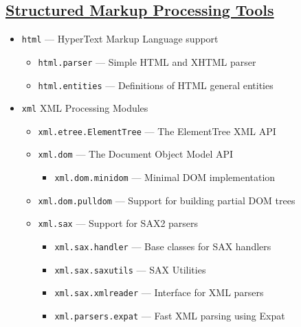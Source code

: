 \documentclass[]{book}
\providecommand{\tightlist}{%
  \setlength{\itemsep}{0pt}\setlength{\parskip}{0pt}}
\theoremstyle{definition}
\theoremstyle{definition}
\theoremstyle{definition}
\theoremstyle{remark}
\begin{document}
\subsection{\texorpdfstring{\href{https://docs.python.org/3.7/library/markup.html}{Structured
Markup Processing
Tools}}{Structured Markup Processing Tools}}\label{structured-markup-processing-tools}

\begin{itemize}
\tightlist
\item
  \texttt{html} --- HyperText Markup Language support

  \begin{itemize}
  \tightlist
  \item
    \texttt{html.parser} --- Simple HTML and XHTML parser
  \item
    \texttt{html.entities} --- Definitions of HTML general entities
  \end{itemize}
\item
  \texttt{xml} XML Processing Modules

  \begin{itemize}
  \tightlist
  \item
    \texttt{xml.etree.ElementTree} --- The ElementTree XML API
  \item
    \texttt{xml.dom} --- The Document Object Model API

    \begin{itemize}
    \tightlist
    \item
      \texttt{xml.dom.minidom} --- Minimal DOM implementation
    \end{itemize}
  \item
    \texttt{xml.dom.pulldom} --- Support for building partial DOM trees
  \item
    \texttt{xml.sax} --- Support for SAX2 parsers

    \begin{itemize}
    \tightlist
    \item
      \texttt{xml.sax.handler} --- Base classes for SAX handlers
    \item
      \texttt{xml.sax.saxutils} --- SAX Utilities
    \item
      \texttt{xml.sax.xmlreader} --- Interface for XML parsers
    \item
      \texttt{xml.parsers.expat} --- Fast XML parsing using Expat
    \end{itemize}
  \end{itemize}
\end{itemize}
\end{document}
